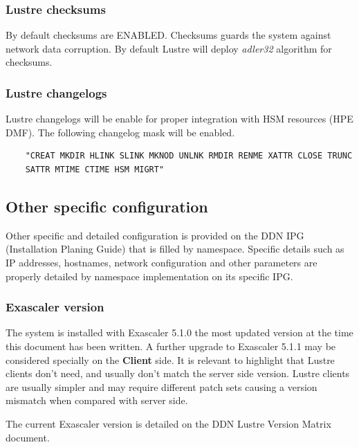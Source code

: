 \documentclass{article}
\begin{document}
\subsubsection{Lustre checksums}
By default checksums are ENABLED. Checksums guards the system against network data corruption. By default Lustre will deploy \textit{adler32} algorithm for checksums.

\subsubsection{Lustre changelogs}
Lustre changelogs will be enable for proper integration with HSM resources (HPE DMF). The following changelog mask will be enabled.
\begin{verbatim}
    "CREAT MKDIR HLINK SLINK MKNOD UNLNK RMDIR RENME XATTR CLOSE TRUNC
    SATTR MTIME CTIME HSM MIGRT"
\end{verbatim}

\subsection{Other specific configuration}
Other specific and detailed configuration is provided on the DDN IPG (Installation Planing Guide) that is filled by namespace. Specific details such as IP addresses, hostnames, network configuration and other parameters are properly detailed by namespace implementation on its specific IPG. 

\subsubsection{Exascaler version}
The system is installed with Exascaler 5.1.0 the most updated version at the time this document has been written. A further upgrade to Exascaler 5.1.1 may be considered specially on the \textbf{Client} side. It is relevant to highlight that Lustre clients don't need, and usually don't match the server side version. Lustre clients are usually simpler and may require different patch sets causing a version mismatch when compared with server side. 

The current Exascaler version is detailed on the DDN Lustre Version Matrix document.
\end{document}
